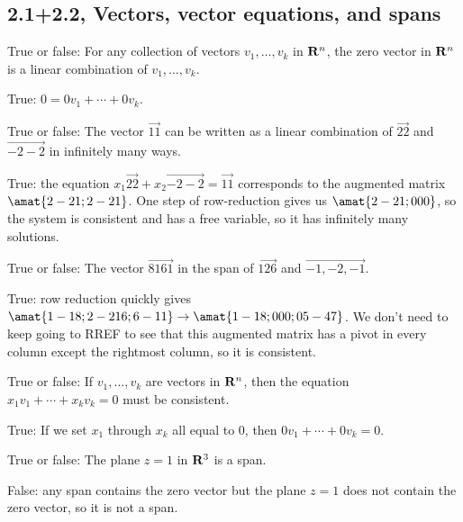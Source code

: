 \subsection{2.1+2.2, Vectors, vector equations, and spans}
\begin{problems}
\problem %
True or false: For any collection of vectors $v_1, \ldots, v_k$ in ${\bf R}^n$, the zero vector in ${\bf R}^n$ is a linear combination of $v_1, \ldots, v_k$.

\begin{solution}
True: $0 = 0 v_1 + \cdots + 0 v_k$.
\end{solution}

\problem %
True or false: The vector $\vec{1 1}$ can be written as a linear combination of $\vec{2 2}$ and $\vec{-2 -2}$ in infinitely many ways.

\begin{solution}
 True: the equation $x_1 \vec{2 2} + x_2 \vec{-2 -2} = \vec{1 1}$ corresponds to the augmented matrix $\amat{2 -2 1; 2 -2 1}$.  One step of row-reduction gives us $\amat{2 -2 1; 0 0 0}$, so the system is consistent and has a free variable, so it has infinitely many solutions.  
\end{solution}

\problem %
True or false: The vector $\vec{8 16 1}$ in the span of $\vec{1 2 6}$ and 
$\vec{-1, -2, -1}$.

\begin{solution}
True: row reduction quickly gives $\amat{1 -1 8; 2 -2 16; 6 -1 1} \to \amat{1 -1 8; 0 0 0; 0 5 -47}$.  We don't need to keep going to RREF to see that this augmented matrix has a pivot in every column except the rightmost column, so it is consistent.
\end{solution}

\problem %
True or false: If $v_1, \ldots, v_k$ are vectors in ${\bf R}^n$, then the equation $x_1 v_1 + \cdots + x_k v_k = 0$ must be consistent.

\begin{solution}
True: If we set $x_1$ through $x_k$ all equal to $0$, then 
$0v_1 + \cdots + 0v_k = 0$.  
\end{solution}

\problem %
True or false: The plane $z=1$ in ${\bf R}^3$ is a span.

\begin{solution}
False: any span contains the zero vector but the plane $z=1$ does not contain the zero vector, so it is not a span.
\end{solution}


\end{problems}
